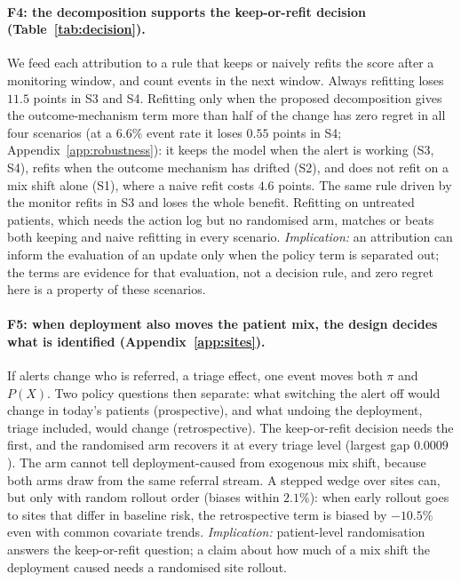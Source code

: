 \documentclass[letterpaper]{article} %
\begin{document}
\paragraph{F4: the decomposition supports the keep-or-refit decision
(Table~\ref{tab:decision}).} We feed each attribution to a rule that keeps or
naively refits the score after a monitoring window, and count events in the
next window. Always refitting loses $11.5$ points in S3 and S4. Refitting only
when the proposed decomposition gives the outcome-mechanism term more than
half of the change has zero regret in all four scenarios (at a $6.6\%$ event
rate it loses $0.55$ points in S4; Appendix~\ref{app:robustness}): it keeps
the model when the alert is working (S3, S4), refits when the outcome
mechanism has drifted (S2), and does not refit on a mix shift alone (S1),
where a naive refit costs $4.6$ points. The same rule driven by the monitor
refits in S3 and loses the whole benefit. Refitting on untreated patients,
which needs the action log but no randomised arm, matches or beats both
keeping and naive refitting in every scenario. \emph{Implication:} an
attribution can inform the evaluation of an update only when the policy term
is separated out; the terms are evidence for that evaluation, not a decision
rule, and zero regret here is a property of these scenarios.

\paragraph{F5: when deployment also moves the patient mix, the design decides
what is identified (Appendix~\ref{app:sites}).} If alerts change who is
referred, a triage effect, one event moves both $\pi$ and $P(X)$. Two policy
questions then separate: what switching the alert off would change in today's
patients (prospective), and what undoing the deployment, triage included,
would change (retrospective). The keep-or-refit decision needs the first, and
the randomised arm recovers it at every triage level (largest gap $0.0009$).
The arm cannot tell deployment-caused from exogenous mix shift, because both
arms draw from the same referral stream. A stepped wedge over sites can, but
only with random rollout order (biases within $2.1\%$): when early rollout
goes to sites that differ in baseline risk, the retrospective term is biased
by $-10.5\%$ even with common covariate trends. \emph{Implication:}
patient-level randomisation answers the keep-or-refit question; a claim about
how much of a mix shift the deployment caused needs a randomised site rollout.
\end{document}
